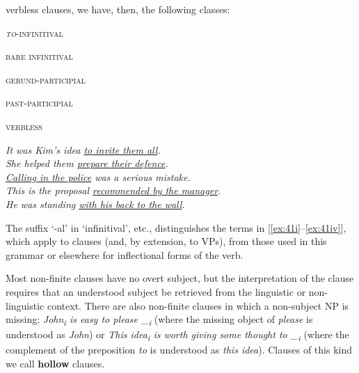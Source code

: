 \noindent verbless clauses, we have, then, the following classes:
\begin{examples}
    \item \label{ex:41}
    \noindent\begin{minipage}[t]{0.3\linewidth}\vspace{-6pt}
        \begin{examples}
        \item\label{ex:41i}\textsc{\textit{to}-infinitival}
        \item\label{ex:41ii}\textsc{bare infinitival}
        \item\label{ex:41ii}\textsc{gerund-participial}
        \item\label{ex:41iv}\textsc{past-participial}
        \item\label{ex:41v}\textsc{verbless}
        \end{examples}
    \end{minipage}
    \begin{minipage}[t]{0.7\linewidth}
        \textit{It was Kim's idea \uline{to invite them all}.}\\
        \textit{She helped them \uline{prepare their defence}.}\\
        \textit{\uline{Calling in the police} was a serious mistake.}\\
        \textit{This is the proposal \uline{recommended by the manager}.}\\
        \textit{He was standing \uline{with his back to the wall}.}
    \end{minipage}
\end{examples}
The suffix `-al' in `infinitival', etc., distinguishes the terms in [\ref{ex:41i}--\ref{ex:41iv}], which apply to clauses (and, by extension, to VPs), from those used in this grammar or elsewhere for inflectional forms of the verb.

Most non-finite clauses have no overt subject, but the interpretation of the clause requires that an understood subject be retrieved from the linguistic or non-linguistic context. There are also non-finite clauses in which a non-subject NP is missing: \textit{John\textsubscript{i} is easy \ob to please \_\textsubscript{i}\cb} (where the missing object of \textit{please} is understood as \textit{John}) or \textit{This idea\textsubscript{i} is worth \ob giving some thought to \_\textsubscript{i}\cb} (where the complement of the preposition \textit{to} is understood as \textit{this idea}). Clauses of this kind we call \textbf{hollow} clauses.

